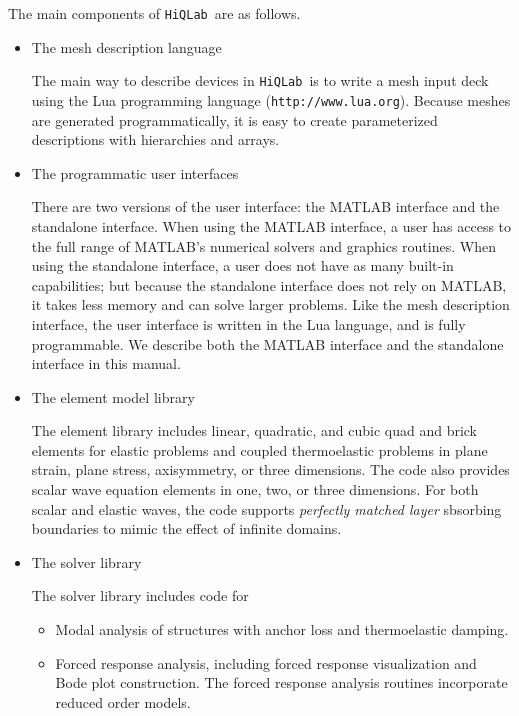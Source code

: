 \documentclass{article}
\newcommand{\hiq}{\texttt{HiQLab}}
\newcommand{\ttt}[1]{\texttt{#1}}
\begin{document}
The main components of \hiq\ are as follows.

\begin{itemize}
\item The mesh description language

The main way to describe devices in \hiq\ is to write a mesh input
deck using the Lua programming language (\ttt{http://www.lua.org}).
Because meshes are generated programmatically, it is easy to create
parameterized descriptions with hierarchies and arrays.

\item The programmatic user interfaces

There are two versions of the user interface: the MATLAB interface and
the standalone interface.  When using the MATLAB interface, a user has
access to the full range of MATLAB's numerical solvers and graphics
routines.  When using the standalone interface, a user does not have
as many built-in capabilities; but because the standalone interface
does not rely on MATLAB, it takes less memory and can solve larger
problems.  Like the mesh description interface, the user interface is
written in the Lua language, and is fully programmable.  We describe
both the MATLAB interface and the standalone interface in this manual.

\item The element model library

The element library includes linear, quadratic, and cubic quad and
brick elements for elastic problems and coupled thermoelastic problems
in plane strain, plane stress, axisymmetry, or three dimensions.  The
code also provides scalar wave equation elements in one, two, or three
dimensions.  For both scalar and elastic waves, the code supports
\emph{perfectly matched layer} sbsorbing boundaries to mimic the
effect of infinite domains.

\item The solver library

The solver library includes code for
\begin{itemize}
  \item Modal analysis of structures with anchor loss and
    thermoelastic damping.
  \item Forced response analysis, including forced response
    visualization and Bode plot construction.  The forced response
    analysis routines incorporate reduced order models.
\end{itemize}

\end{itemize}
\end{document}
